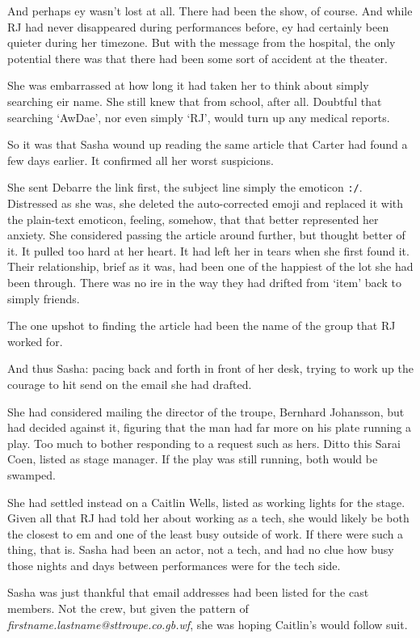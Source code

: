 And perhaps ey wasn't lost at all. There had been the show, of course. And while RJ had never disappeared during performances before, ey had certainly been quieter during her timezone. But with the message from the hospital, the only potential there was that there had been some sort of accident at the theater.

She was embarrassed at how long it had taken her to think about simply searching eir name. She still knew that from school, after all. Doubtful that searching `AwDae', nor even simply `RJ', would turn up any medical reports.

So it was that Sasha wound up reading the same article that Carter had found a few days earlier. It confirmed all her worst suspicions.

She sent Debarre the link first, the subject line simply the emoticon \texttt{:/}. Distressed as she was, she deleted the auto-corrected emoji and replaced it with the plain-text emoticon, feeling, somehow, that that better represented her anxiety. She considered passing the article around further, but thought better of it. It pulled too hard at her heart. It had left her in tears when she first found it. Their relationship, brief as it was, had been one of the happiest of the lot she had been through. There was no ire in the way they had drifted from `item' back to simply friends.

The one upshot to finding the article had been the name of the group that RJ worked for.

And thus Sasha: pacing back and forth in front of her desk, trying to work up the courage to hit send on the email she had drafted.

She had considered mailing the director of the troupe, Bernhard Johansson, but had decided against it, figuring that the man had far more on his plate running a play. Too much to bother responding to a request such as hers. Ditto this Sarai Coen, listed as stage manager. If the play was still running, both would be swamped.

She had settled instead on a Caitlin Wells, listed as working lights for the stage. Given all that RJ had told her about working as a tech, she would likely be both the closest to em and one of the least busy outside of work. If there were such a thing, that is. Sasha had been an actor, not a tech, and had no clue how busy those nights and days between performances were for the tech side.

Sasha was just thankful that email addresses had been listed for the cast members. Not the crew, but given the pattern of \emph{firstname.lastname@sttroupe.co.gb.wf}, she was hoping Caitlin's would follow suit.

